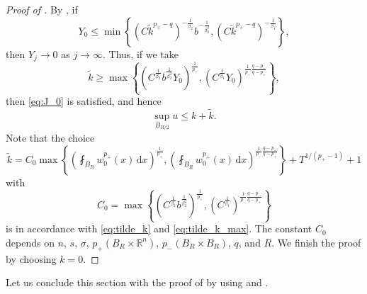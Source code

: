 \documentclass[11pt]{amsart}
\theoremstyle{plain}
\theoremstyle{definition}
\numberwithin{equation}{section}
\begin{document}
\begin{proof} [Proof of ]
By , if
\begin{equation} \label{eq:J_0}
Y_0 \leq \min \left\lbrace (C\tilde{k}^{p_+-q})^{-\frac{1}{\beta_2}} b^{-\frac{1}{\beta_2^2}}, (C\tilde{k}^{p_+-q})^{-\frac{1}{\beta_1}} \right\rbrace,
\end{equation}
then $Y_j \to 0$ as $j \to \infty$. Thus, if we take
\begin{equation} \label{eq:tilde_k_max}
\tilde{k} \geq \max \left\lbrace \left( C^{\frac{1}{\beta_2}}b^{\frac{1}{\beta_2^2}} Y_0 \right)^{\frac{1}{p_+}}, \left( C^{\frac{1}{\beta_1}} Y_0 \right)^{\frac{1}{p_-} \frac{q-p_-}{q-p_+}} \right\rbrace,
\end{equation}
then \eqref{eq:J_0} is satisfied, and hence
\begin{equation*}
\sup_{B_{R/2}} u \leq k+\tilde{k}.
\end{equation*}
Note that the choice
\begin{equation*}
\tilde{k} = C_0 \max \left\lbrace \left( \fint_{B_{R}} w_0^{p_+}(x) \,\mathrm{d}x \right)^{\frac{1}{p_+}}, \left( \fint_{B_{R}} w_0^{p_+}(x) \,\mathrm{d}x \right)^{\frac{1}{p_-} \frac{q-p_-}{q-p_+}} \right\rbrace +T^{1/(p_+-1)}+1
\end{equation*}
with
\begin{equation*}
C_0 = \max \left\lbrace \left( C^{\frac{1}{\beta_2}}b^{\frac{1}{\beta_2^2}} \right)^{\frac{1}{p_+}}, \left( C^{\frac{1}{\beta_1}} \right)^{\frac{1}{p_-} \frac{q-p_-}{q-p_+}} \right\rbrace
\end{equation*}
is in accordance with \eqref{eq:tilde_k} and \eqref{eq:tilde_k_max}. The constant $C_0$ depends on $n$, $s$, $\sigma$, $p_+(B_R \times \mathbb{R}^n)$, $p_-(B_R\times B_R)$, $q$, and $R$. We finish the proof by choosing $k=0$.
\end{proof}

Let us conclude this section with the proof of  by using  and .
\end{document}
